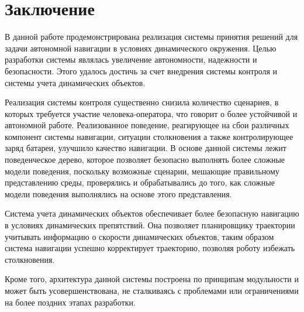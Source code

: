 \chapter{Заключение}
\label{ch:chap5}

В данной работе продемонстрирована реализация системы принятия решений для задачи автономной навигации в условиях динамического окружения. Целью разработки системы являлась увеличение автономности, надежности и безопасности. Этого удалось достичь за счет внедрения системы контроля и системы учета динамических объектов. 

Реализация системы контроля существенно снизила количество сценариев, в которых требуется участие человека-оператора, что говорит о более устойчивой и автономной работе. Реализованное поведение, реагирующее на сбои различных компонент системы навигации, ситуации столкновения а также контролирующее заряд батареи,  улучшило качество навигации. В основе данной системы лежит поведенческое дерево, которое позволяет безопасно выполнять более сложные модели поведения, поскольку возможные сценарии, мешающие правильному представлению среды, проверялись и обрабатывались до того, как сложные модели поведения выполнялись на основе этого представления. 

Система учета динамических объектов обеспечивает более безопасную навигацию в условиях динамических препятствий. Она позволяет планировщику траектории учитывать информацию о скорости динамических объектов, таким образом система навигации успешно корректирует траекторию, позволяя роботу избежать столкновения.

Кроме того, архитектура данной системы построена по принципам модульности и может быть усовершенствована, не сталкиваясь с проблемами или ограничениями на более поздних этапах разработки.
